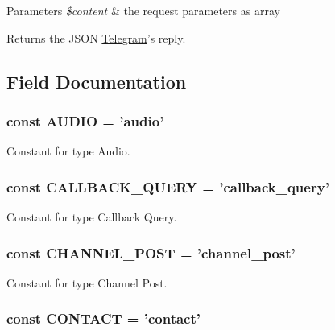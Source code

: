 \begin{DoxyParams}{Parameters}
{\em \$content} & the request parameters as array \\
\hline
\end{DoxyParams}
\begin{DoxyReturn}{Returns}
the J\-S\-O\-N \hyperlink{class_telegram}{Telegram}'s reply. 
\end{DoxyReturn}


\subsection{Field Documentation}
\hypertarget{class_telegram_a9f6cfe013372d7de1568a95c871214d1}{
\subsubsection[{A\-U\-D\-I\-O}]{\setlength{\rightskip}{0pt plus 5cm}const A\-U\-D\-I\-O = 'audio'}}\label{class_telegram_a9f6cfe013372d7de1568a95c871214d1}
Constant for type Audio. \hypertarget{class_telegram_a464a4a095bb928388381b33e0babf9fe}{
\subsubsection[{C\-A\-L\-L\-B\-A\-C\-K\-\_\-\-Q\-U\-E\-R\-Y}]{\setlength{\rightskip}{0pt plus 5cm}const C\-A\-L\-L\-B\-A\-C\-K\-\_\-\-Q\-U\-E\-R\-Y = 'callback\-\_\-query'}}\label{class_telegram_a464a4a095bb928388381b33e0babf9fe}
Constant for type Callback Query. \hypertarget{class_telegram_a017c4bf971da66fae8b480ba38f2c44c}{
\subsubsection[{C\-H\-A\-N\-N\-E\-L\-\_\-\-P\-O\-S\-T}]{\setlength{\rightskip}{0pt plus 5cm}const C\-H\-A\-N\-N\-E\-L\-\_\-\-P\-O\-S\-T = 'channel\-\_\-post'}}\label{class_telegram_a017c4bf971da66fae8b480ba38f2c44c}
Constant for type Channel Post. \hypertarget{class_telegram_aac7f4f1b55319f64ad56ae8a8222d9b5}{
\subsubsection[{C\-O\-N\-T\-A\-C\-T}]{\setlength{\rightskip}{0pt plus 5cm}const C\-O\-N\-T\-A\-C\-T = 'contact'}}\label{class_telegram_aac7f4f1b55319f64ad56ae8a8222d9b5}
